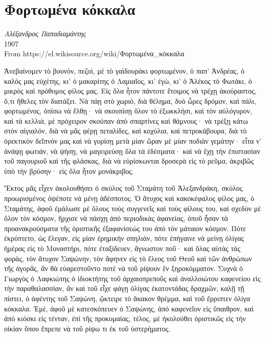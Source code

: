 \documentclass{article}
\begin{document}
\section*{Φορτωμένα κόκκαλα}

\textit{Αλέξανδρος Παπαδιαμάντης}\\
1907\\
From https://el.wikisource.org/wiki/Φορτωμένα\_κόκκαλα

{}

\begin{multicols}{3}

Ἀνεβαίνομεν τὸ βουνὸν, πεζοὶ, μὲ τὸ γαϊδουράκι φορτωμένον, ὁ παπ’
Ἀνδρέας, ὁ καλός μας εὐχέτης, κι’ ὁ μακαρίτης ὁ Λαμιαῖος, κι’ ἐγὼ, κι’
ὁ Ἀλέκος τὸ Φωτάκι, ὁ μικρὸς καὶ πρόθυμος φίλος μας. Εἰς ὅλα ἦτον
πάντοτε ἕτοιμος νὰ τρέχῃ ἀκούραστος, ὅ,τι ἤθελες τὸν διατάξει. Νὰ πάῃ
στὸ χωριὸ, διὰ θέλημα, δυὸ ὧρες δρόμον, καὶ πάλι, φορτωμένος, ὀπίσω νὰ
ἔλθῃ· νὰ σκουπίσῃ ὅλον τὸ ἐξωκκλήσι, καὶ τὸν αὐλόγυρον, καὶ τὰ κελλιὰ,
μὲ πρόχειρον σκούπαν ἀπὸ σπαρτίνες καὶ θάμνους· νὰ τρέξῃ κάτω στὸν
αἰγιαλόν, διὰ νὰ μᾶς φέρῃ πεταλίδες, καὶ κοχύλια, καὶ πετροκάβουρα, διὰ
τὸ ὀρεκτικὸν δεῖπνόν μας καὶ νὰ γυρίσῃ μετὰ μίαν ὥραν μὲ μίαν ποδιὰν
γεμάτην· εἶτα ν’ ἀνάψῃ φωτιάν, νὰ ψήσῃ, νὰ μαγειρεύσῃ ὅλα τὰ ἐδέσματα·
καὶ νὰ ἔχῃ τὴν ἐπιστασίαν τοῦ παγουριοῦ καὶ τῆς φλάσκας, διὰ νὰ
εὑρίσκωνται δροσερὰ εἰς τὸ ρεῦμα, ἀκριβῶς ὑπὸ τὴν βρύσην· εἰς ὅλα ἦτον
μονάκριβος.

Ἕκτος μᾶς εἶχεν ἀκολουθήσει ὁ σκύλος τοῦ Σταμάτη τοῦ Ἀλεξανδράκη,
σκύλος προωρισμένος ὀψέποτε νὰ μένῃ ἀδέσποτος. Ὁ ἄτυχος καὶ κακοκέφαλος
φίλος μας, ὁ Σταμάτης, ἀφοῦ ἐμάλωσε μὲ ὅλους τοὺς συγγενεῖς καὶ τοὺς
φίλους του, καὶ σχεδὸν μὲ ὅλον τὸν κόσμον, ἤρχισε νὰ πάσχῃ ἀπὸ
περιοδικὰς ἀφανείας, ὁποῦ ἦσαν τὰ προανακρούσματα τῆς ὁριστικῆς
ἐξαφανίσεώς του ἀπὸ τὸν μάταιον κόσμον. Πότε ἐκρύπτετο, ὡς ἔλεγαν, εἰς
μίαν ἐρημικὴν σπηλιὰν, πότε ἐπήγαινε νὰ μείνῃ ὀλίγας ἡμέρας εἰς τὸ
Μοναστήρι, πότε ἐταξίδευεν, ἄγνωστον ποῦ· καὶ ὅλας αὐτὰς τὰς φορὰς, τὸν
ἄτυχον Σαψώνην, τὸν ἄφηνεν εἰς τὸ ἔλεος τοῦ Θεοῦ καὶ τῶν ἀνθρώπων τῆς
ἀγορᾶς, ἂν θὰ εὐαρεστοῦντο ποτὲ νὰ τοῦ ρίψουν ἓν ξηροκόμματον. Συχνὰ ὁ
Γιωργὸς ὁ Λαφκιώτης ὁ ἰδιοκτήτης τοῦ ἀρχαιοπρεποῦς καὶ ἀναλλοιώτου
καφενείου εἰς τὴν παραθαλασσίαν, ἂν καὶ τοῦ εἶχε φάγῃ ὀλίγας
ἑκατοντάδας δραχμῶν, καλῇ τῇ πίστει, ὁ ἀφέντης τοῦ Σαψώνη, ᾤκτειρε τὸ
ἄκακον θρέμμα, καὶ τοῦ ἔρριπτεν ὀλίγα κόκκαλα. Ἐμὲ, ἀφοῦ μὲ
κατεσκόπευεν ὁ Σαψώνης, ἀπὸ καφενεῖον εἰς ὕπαιθρον, καὶ ἀπὸ κιόσκι εἰς
τένταν, ἐπὶ τῆς προκυμαίας, τέλος, μὲ ἠκολούθει ὁριστικῶς εἰς τὴν
οἰκίαν ὅπου ἔπρεπε νὰ τοῦ ρίψω τι ἐκ τοῦ ὑστερήματος.


\end{multicols}
\end{document}
